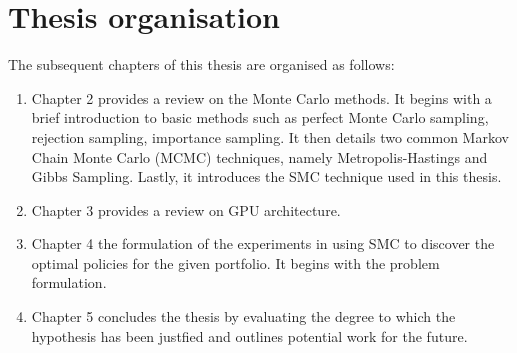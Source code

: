 \section{Thesis organisation}
The subsequent chapters of this thesis are organised as follows:
\begin{enumerate}
\item Chapter 2 provides a review on the Monte Carlo methods. It begins with a brief introduction to basic methods such as perfect Monte Carlo sampling, rejection sampling, importance sampling. It then details two common Markov Chain Monte Carlo (MCMC) techniques, namely Metropolis-Hastings and Gibbs Sampling. Lastly, it introduces the SMC technique used in this thesis. 
\item Chapter 3 provides a review on GPU architecture.
\item Chapter 4 the formulation of the experiments in using SMC to discover the optimal policies for the given portfolio. It begins with the problem formulation.
\item Chapter 5 concludes the thesis by evaluating the degree to which the hypothesis has been justfied and outlines potential work for the future.
\end{enumerate}


